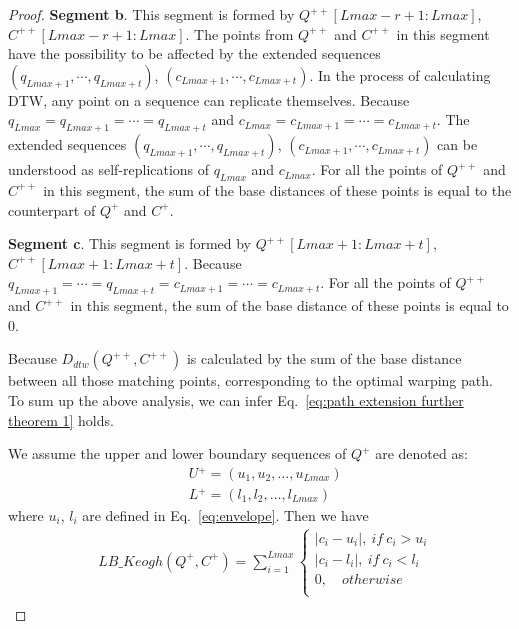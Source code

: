 \documentclass[10pt,journal,compsoc]{IEEEtran}
\begin{document}
\begin{proof}
\textbf{Segment b}.
This segment is formed by $Q^{++}[Lmax-r+1:Lmax]$, $C^{++}[Lmax-r+1:Lmax]$.
The points from $Q^{++}$ and $C^{++}$ in this segment have the possibility to be affected by the extended sequences
$(q_{Lmax+1}, \cdots,q_{Lmax+t})$, $(c_{Lmax+1}, \cdots,c_{Lmax+t})$.
In the process of calculating DTW, any point on a sequence can replicate themselves.
Because $q_{Lmax}=q_{Lmax+1}=\cdots=q_{Lmax+t}$ and $c_{Lmax}=c_{Lmax+1}=\cdots=c_{Lmax+t}$.
The extended sequences $(q_{Lmax+1}, \cdots,q_{Lmax+t})$, $(c_{Lmax+1}, \cdots,c_{Lmax+t})$ can be understood as
self-replications of $q_{Lmax}$ and $c_{Lmax}$.
For all the points of $Q^{++}$ and $C^{++}$ in this segment,
the sum of the base distances of these points is equal to the counterpart of $Q^+$ and $C^+$.

\textbf{Segment c}.
This segment is formed by $Q^{++}[Lmax+1:Lmax+t]$, $C^{++}[Lmax+1:Lmax+t]$.
Because $q_{Lmax+1}=\cdots=q_{Lmax+t}=c_{Lmax+1}=\cdots=c_{Lmax+t}$.
For all the points of $Q^{++}$ and $C^{++}$ in this segment,
the sum of the base distance of these points is equal to 0.

Because $D_{dtw}(Q^{++},C^{++})$ is calculated by the sum of the base distance between all those matching points,
corresponding to the optimal warping path.
To sum up the above analysis, we can infer Eq.~\eqref{eq:path extension further theorem 1} holds.

We assume the upper and lower boundary sequences of $Q^+$ are denoted as:
\begin{equation}\label{eq:path extension further proof 1}
\begin{split}
   & U{^+} = ( u_1, u_2,\ldots, u_{Lmax} ) \\
   & L{^+} = ( l_1, l_2,\ldots, l_{Lmax} )
\end{split}
\end{equation}
where $u_i$, $l_i$ are defined in Eq.~\eqref{eq:envelope}.
Then we have
\begin{equation}\label{eq:path extension further proof 2}
\begin{split}
& LB\_Keogh(Q^+,C^+)= \sum\limits_{i=1}^{Lmax}  \left\{ {\begin{array}{l}
 |c_i-u_i|,  \ if \  c_i>u_i \\
 |c_i-l_i|,  \ if \  c_i<l_i \\
  0,  \quad otherwise \\
 \end{array}} \right.  \\
\end{split}
\end{equation}


\end{proof}
\end{document}
